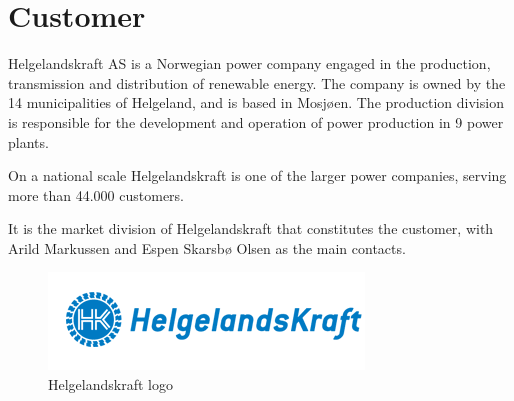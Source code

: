 \section{Customer}
Helgelandskraft AS is a Norwegian power company engaged in the production,
transmission and distribution of renewable energy. The company is owned by
the 14 municipalities of Helgeland, and is based in Mosjøen. The production
division is responsible for the development and operation of power production
in 9 power plants.\cite{helgelandskraft}

On a national scale Helgelandskraft is one of the larger power companies,
serving more than 44.000 customers.

It is the market division of Helgelandskraft that constitutes the customer,
with Arild Markussen and Espen Skarsbø Olsen as the main contacts. 

\begin{figure}[H]
		\centering
		\includegraphics[scale=1.0]{pictures/helgelandskraft.png}
		\caption{Helgelandskraft logo}
	\end{figure}
